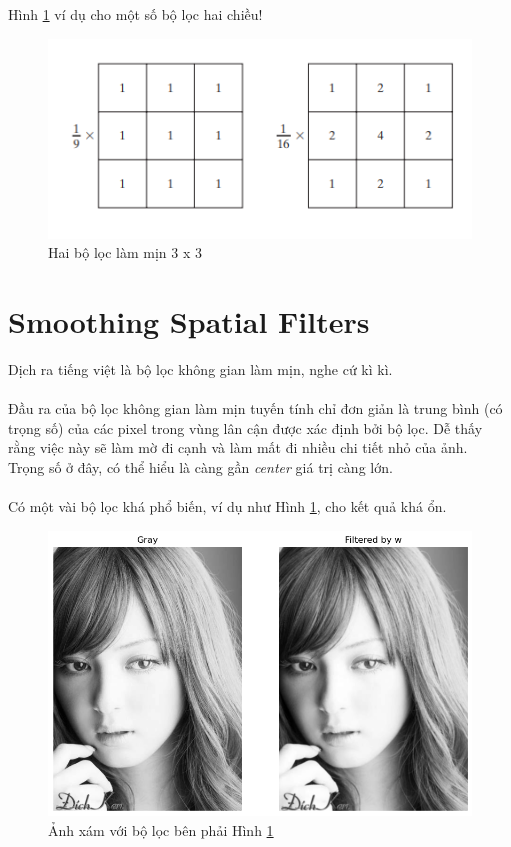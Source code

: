 \documentclass{article}
\begin{document}
        Hình \ref{fig4} ví dụ cho một số bộ lọc hai chiều! 
        \begin{figure}[ht!]
            \centering
            \includegraphics[width = 0.7\linewidth]{fig4.png}
            \caption{Hai bộ lọc làm mịn 3 x 3}
            \label{fig4}
        \end{figure}
    \section{Smoothing Spatial Filters}
    Dịch ra tiếng việt là bộ lọc không gian làm mịn, nghe cứ kì kì.\\ \\
    Đầu ra của bộ lọc không gian làm mịn tuyến tính chỉ đơn giản là trung bình (có trọng số) của các pixel trong vùng lân cận được xác định bởi bộ lọc. Dễ thấy rằng việc này sẽ làm mờ đi cạnh và làm mất đi nhiều chi tiết nhỏ của ảnh.\\ 
    Trọng số ở đây, có thể hiểu là càng gần \textit{center} giá trị càng lớn.\\ \\
    Có một vài bộ lọc khá phổ biến, ví dụ như Hình \ref{fig4}, cho kết quả khá ổn.\\
    \begin{figure}[ht!]
        \centering
        \includegraphics[width = 0.8\linewidth]{download.png}
        \caption{Ảnh xám với bộ lọc bên phải Hình \ref{fig4}}
        \label{fig5}
    \end{figure}
\end{document}
